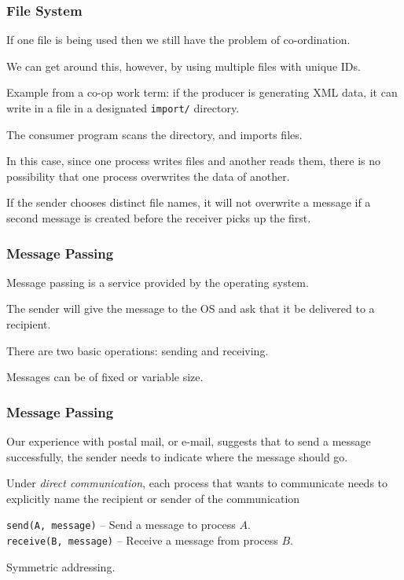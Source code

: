 \begin{frame}
\frametitle{File System}

If one file is being used then we still have the problem of co-ordination.

We can get around this, however, by using multiple files with unique IDs. 

Example from a co-op work term: if the producer is generating XML data, it can write in a file in a designated \texttt{import/} directory. 

The consumer program scans the directory, and imports files.

In this case, since one process writes files and another reads them, there is no possibility that one process overwrites the data of another. 

If the sender chooses distinct file names, it will not overwrite a message if a second message is created before the receiver picks up the first.

\end{frame}

\begin{frame}
\frametitle{Message Passing}

Message passing is a service provided by the operating system.

The sender will give the message to the OS and ask that it be delivered to a recipient.

  There are two basic operations: sending and receiving. 
  
  Messages can be of fixed or variable size.


\end{frame}

\begin{frame}
\frametitle{Message Passing}

Our experience with postal mail, or e-mail, suggests that to send a message successfully, the sender needs to indicate where the message should go. 

Under \textit{direct communication}, each process that wants to communicate needs to explicitly name the recipient or sender of the communication


\texttt{send(A, message)} -- Send a message to process $A$.\\
\texttt{receive(B, message)} -- Receive a message from process $B$.

Symmetric addressing.

\end{frame}

